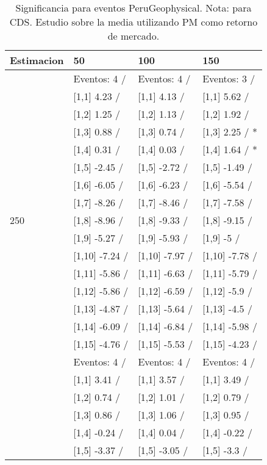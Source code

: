 \begin{table}

\caption{Significancia para eventos PeruGeophysical. Nota: para CDS. Estudio sobre la media utilizando PM como retorno de mercado.}
\centering
\begin{tabular}[t]{llll}
\toprule
Estimacion & 50 & 100 & 150\\
\midrule
 & Eventos:  4 / & Eventos:  4 / & Eventos:  3 /\\
 & {}[1,1] 4.23  / & {}[1,1] 4.13  / & {}[1,1] 5.62  /\\
 & {}[1,2] 1.25  / & {}[1,2] 1.13  / & {}[1,2] 1.92  /\\
 & {}[1,3] 0.88  / & {}[1,3] 0.74  / & {}[1,3] 2.25  / *\\
 & {}[1,4] 0.31  / & {}[1,4] 0.03  / & {}[1,4] 1.64  / *\\
\addlinespace
 & {}[1,5] -2.45  / & {}[1,5] -2.72  / & {}[1,5] -1.49  /\\
 & {}[1,6] -6.05  / & {}[1,6] -6.23  / & {}[1,6] -5.54  /\\
 & {}[1,7] -8.26  / & {}[1,7] -8.46  / & {}[1,7] -7.58  /\\
250 & {}[1,8] -8.96  / & {}[1,8] -9.33  / & {}[1,8] -9.15  /\\
 & {}[1,9] -5.27  / & {}[1,9] -5.93  / & {}[1,9] -5  /\\
\addlinespace
 & {}[1,10] -7.24  / & {}[1,10] -7.97  / & {}[1,10] -7.78  /\\
 & {}[1,11] -5.86  / & {}[1,11] -6.63  / & {}[1,11] -5.79  /\\
 & {}[1,12] -5.86  / & {}[1,12] -6.59  / & {}[1,12] -5.9  /\\
 & {}[1,13] -4.87  / & {}[1,13] -5.64  / & {}[1,13] -4.5  /\\
 & {}[1,14] -6.09  / & {}[1,14] -6.84  / & {}[1,14] -5.98  /\\
\addlinespace
 & {}[1,15] -4.76  / & {}[1,15] -5.53  / & {}[1,15] -4.23  /\\
 & Eventos:  4 / & Eventos:  4 / & Eventos:  4 /\\
 & {}[1,1] 3.41  / & {}[1,1] 3.57  / & {}[1,1] 3.49  /\\
 & {}[1,2] 0.74  / & {}[1,2] 1.01  / & {}[1,2] 0.79  /\\
 & {}[1,3] 0.86  / & {}[1,3] 1.06  / & {}[1,3] 0.95  /\\
\addlinespace
 & {}[1,4] -0.24  / & {}[1,4] 0.04  / & {}[1,4] -0.22  /\\
 & {}[1,5] -3.37  / & {}[1,5] -3.05  / & {}[1,5] -3.3  /\\

\end{tabular}
\end{table}
